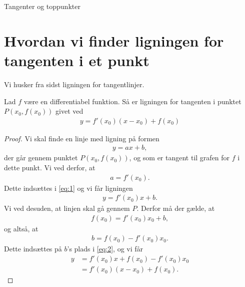 \begin{center}
\Huge
Tangenter og toppunkter
\end{center}
\section*{Hvordan vi finder ligningen for tangenten i et punkt}


Vi husker fra sidst ligningen for tangentlinjer.
\begin{setn}[Tangentligningen]
	Lad $f$ være en differentiabel funktion. Så er ligningen for tangenten i punktet $P(x_0,f(x_0))$ givet ved
	\begin{align*}
		y = f'(x_0)(x-x_0) + f(x_0)
	\end{align*}
\end{setn}
\begin{proof}
	Vi skal finde en linje med ligning på formen 
	\begin{align}\label{eq:1}
		y = ax+b,
	\end{align}
	der går gennem punktet $P(x_0,f(x_0))$, og som er tangent til grafen for $f$ i dette punkt.
	Vi ved derfor, at 
	\begin{align*}
		a = f'(x_0).
	\end{align*}
	Dette indsættes i \eqref{eq:1} og vi får ligningen
	\begin{align}\label{eq:2}
		y = f'(x_0)x + b.
	\end{align}
	Vi ved desuden, at linjen skal gå gennem $P$. Derfor må der gælde, at 
	\begin{align*}
		f(x_0) = f'(x_0)x_0+b,
	\end{align*}
	og altså, at
	\begin{align*}
		b = f(x_0)-f'(x_0)x_0.
	\end{align*}
	Dette indsættes på $b$'s plads i \eqref{eq:2}, og vi får
	\begin{align*}
		y &= f'(x_0)x + f(x_0) - f'(x_0)x_0\\
		&= f'(x_0)(x-x_0)+f(x_0).
	\end{align*}
\end{proof}

